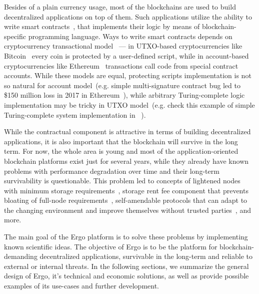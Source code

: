 Besides of a plain currency usage, most of the blockchains are used to build decentralized applications on top of them.
Such applications utilize the ability to write smart contracts~\cite{szabo1994smart}, that implements their logic
by means of blockchain-specific programming language.
Ways to write smart contracts depends on cryptocurrency transactional model~\cite{zahnentferner2018chimeric} ---
in UTXO-based cryptocurrencies like Bitcoin~\cite{nakamoto2008bitcoin} every coin is protected by a user-defined script,
while in account-based cryptocurrencies like Ethereum~\cite{ethWhitepaper} transactions call code from special contract accounts.
While these models are equal, protecting scripts implementation is not so natural for
account model~(e.g. simple multi-signature contract bug led to \$150 million loss in 2017 in Ethereum~\cite{parityLock}),
while arbitrary Turing-complete logic implementation may be tricky in UTXO model~(e.g. check this example of
simple Turing-complete system implementation in \Ergo{}~\cite{chepurnoy2018self}).

While the contractual component is attractive in terms of building decentralized applications,
it is also important that the blockchain will survive in the long term.
For now, the whole area is young and most of the application-oriented blockchain platforms exist just for several years,
while they already have known problems with performance degradation over time 
and their long-term survivability is questionable.
This problem led to concepts of lightened nodes with minimum storage requirements~\cite{reyzin2017improving},
storage rent fee component that prevents bloating of full-node requirements~\cite{chepurnoy2018systematic},
self-amendable protocols that can adapt to the changing environment and improve themselves without
trusted parties~\cite{goodman2014tezos}, and more.

The main goal of the Ergo platform is to solve these problems by implementing known scientific ideas.
The objective of Ergo is to be the platform for blockchain-demanding decentralized
applications, survivable in the long-term and reliable to external or internal threats.
In the following sections, we summarize the general design of Ergo, it's technical and economic solutions,
as well as provide possible examples of its use-cases and further development.